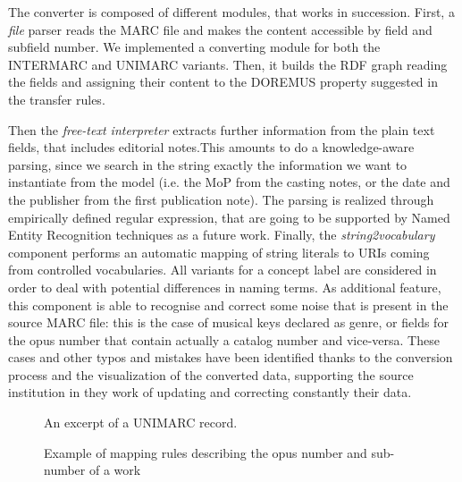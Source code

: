 The converter is composed of different modules, that works in succession. First, a \textit{file} parser reads the MARC file and makes the content accessible by field and subfield number. We implemented a converting module for both the INTERMARC and UNIMARC variants. Then, it builds the RDF graph reading the fields and assigning their content to the DOREMUS property suggested in the transfer rules.

Then the \textit{free-text interpreter} extracts further information from the plain text fields, that includes editorial notes.This amounts to do a knowledge-aware parsing, since we search in the string exactly the information we want to instantiate from the model (i.e. the MoP from the casting notes, or the date and the publisher from the first publication note). The parsing is realized through empirically defined regular expression, that are going to be supported by Named Entity Recognition techniques as a future work. Finally, the \textit{string2vocabulary} component performs an automatic mapping of string literals to URIs coming from controlled vocabularies. All variants for a concept label are considered in order to deal with potential differences in naming terms. As additional feature, this component is able to recognise and correct some noise that is present in the source MARC file: this is the case of musical keys declared as genre, or fields for the opus number that contain actually a catalog number and vice-versa. These cases and other typos and mistakes have been identified thanks to the conversion process and the visualization of the converted data, supporting the source institution in they work of updating and correcting constantly their data.

\begin{figure}
 \centerline{}
  \caption{An excerpt of a UNIMARC record.}
 \label{fig:unimarc}
 \smallskip
 \centerline{}
  \caption{Example of mapping rules describing the opus number and sub-number of a work}
 \label{fig:mappings}
\end{figure}

